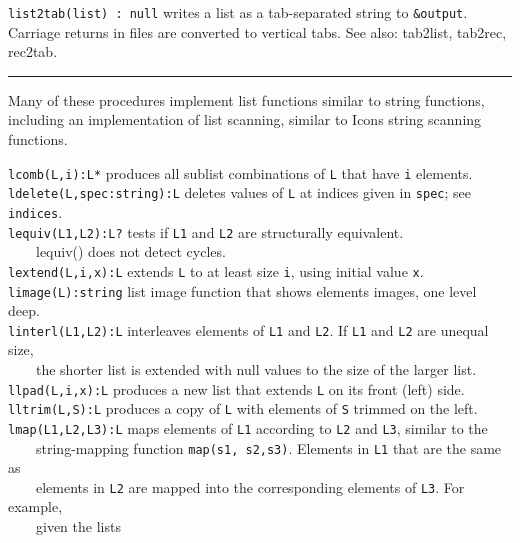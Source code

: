 \texttt{list2tab(list) : null} writes a list as a tab-separated string
to \texttt{\&output}. Carriage returns in files are converted to
vertical tabs.
See also: tab2list, tab2rec, rec2tab. 

\vspace{0.25cm}\hrule{}

Many of these procedures implement list functions
similar to string functions, including an implementation of
list scanning, similar to Icon{\textquotesingle}s
string scanning functions.

\texttt{lcomb(L,i):L*} produces all sublist combinations of \texttt{L}
that have \texttt{i} elements.\\
\texttt{ldelete(L,spec:string):L} deletes values of \texttt{L} at
indices given in \texttt{spec}; see \texttt{indices}.\\
\texttt{lequiv(L1,L2):L?} tests if \texttt{L1} and \texttt{L2} are
structurally equivalent.\\
 \ \ \ \ lequiv() does not detect cycles.\\
\texttt{lextend(L,i,x):L} extends \texttt{L} to at least size
\texttt{i}, using initial value \texttt{x}.\\
\texttt{limage(L):string} list image function that shows
elements{\textquotesingle} images, one level deep.\\
\texttt{linterl(L1,L2):L} interleaves elements of \texttt{L1} and
\texttt{L2}. If \texttt{L1} and \texttt{L2} are unequal size,\\
 \ \ \ \ the shorter list is extended with null values to the
size of the larger list.\\
\texttt{llpad(L,i,x):L} produces a new list that extends \texttt{L} on
its front (left) side.\\
\texttt{lltrim(L,S):L} produces a copy of \texttt{L} with elements of
\texttt{S} trimmed on the left.\\
\texttt{lmap(L1,L2,L3):L} maps elements of \texttt{L1} according to
\texttt{L2} and \texttt{L3}, similar to the\\
 \ \ \ \ string-mapping function \texttt{map(s1, s2,s3)}. Elements in
\texttt{L1} that are the same as\\
 \ \ \ \  elements in \texttt{L2} are mapped into the corresponding elements of \texttt{L3}. For
example,\\
 \ \ \ \ given the lists\\
